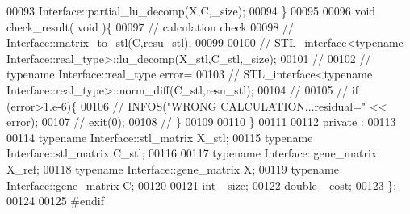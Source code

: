 \begin{DoxyCode}
00093       Interface::partial\_lu\_decomp(X,C,\_size);
00094   \}
00095 
00096   \textcolor{keywordtype}{void} check\_result( \textcolor{keywordtype}{void} )\{
00097     \textcolor{comment}{// calculation check}
00098 \textcolor{comment}{//     Interface::matrix\_to\_stl(C,resu\_stl);}
00099 
00100 \textcolor{comment}{//     STL\_interface<typename Interface::real\_type>::lu\_decomp(X\_stl,C\_stl,\_size);}
00101 \textcolor{comment}{//}
00102 \textcolor{comment}{//     typename Interface::real\_type error=}
00103 \textcolor{comment}{//       STL\_interface<typename Interface::real\_type>::norm\_diff(C\_stl,resu\_stl);}
00104 \textcolor{comment}{//}
00105 \textcolor{comment}{//     if (error>1.e-6)\{}
00106 \textcolor{comment}{//       INFOS("WRONG CALCULATION...residual=" << error);}
00107 \textcolor{comment}{//       exit(0);}
00108 \textcolor{comment}{//     \}}
00109 
00110   \}
00111 
00112 private :
00113 
00114   \textcolor{keyword}{typename} Interface::stl\_matrix X\_stl;
00115   \textcolor{keyword}{typename} Interface::stl\_matrix C\_stl;
00116 
00117   \textcolor{keyword}{typename} Interface::gene\_matrix X\_ref;
00118   \textcolor{keyword}{typename} Interface::gene\_matrix X;
00119   \textcolor{keyword}{typename} Interface::gene\_matrix C;
00120 
00121   \textcolor{keywordtype}{int} \_size;
00122   \textcolor{keywordtype}{double} \_cost;
00123 \};
00124 
00125 \textcolor{preprocessor}{#endif}
\end{DoxyCode}
